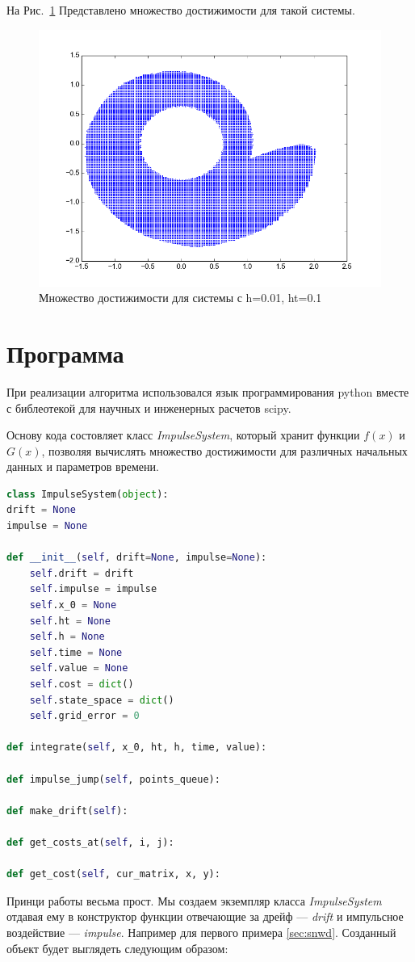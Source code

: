 \documentclass[a4paper,12pt]{article}
\begin{document}
На Рис.~\ref{fig:v1h0.02} Представлено множество достижимости для
такой системы.


\begin{figure}[h]
  \centering

  \includegraphics[width=0.5\linewidth]{img/figure_d_h_001_ht_01}
  \hfil \caption{Множество достижимости для системы с h=0.01, ht=0.1}
  \label{fig:v1h0.02}
\end{figure}

\section{Программа}
\label{sec:program}

При реализации алгоритма использовался язык программирования python
вместе с библеотекой для научных и инженерных расчетов scipy.

Основу кода состовляет класс \emph{ImpulseSystem}, который хранит
функции $f(x)$ и $G(x)$, позволяя вычислять множество достижимости для
различных начальных данных и параметров времени. 

\begin{lstlisting}[language=Python,
caption={Интерфейс Impulse System}]
class ImpulseSystem(object):
drift = None
impulse = None

def __init__(self, drift=None, impulse=None):
    self.drift = drift
    self.impulse = impulse
    self.x_0 = None
    self.ht = None
    self.h = None
    self.time = None
    self.value = None
    self.cost = dict()
    self.state_space = dict()
    self.grid_error = 0

def integrate(self, x_0, ht, h, time, value):

def impulse_jump(self, points_queue):

def make_drift(self):

def get_costs_at(self, i, j):

def get_cost(self, cur_matrix, x, y):
\end{lstlisting}

Принци работы весьма прост. Мы создаем экземпляр класса
\emph{ImpulseSystem} отдавая ему в конструктор функции отвечающие за
дрейф --- \emph{drift} и импульсное воздействие ---
\emph{impulse}. Например для первого примера \ref{sec:snwd}. Созданный объект будет
выглядеть следующим образом:
\end{document}
